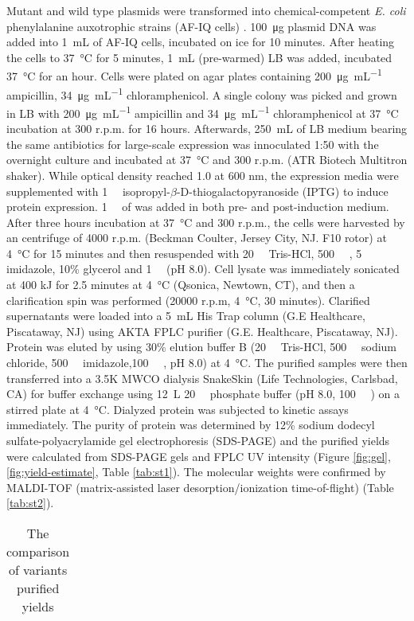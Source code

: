 \begin{refsection}
Mutant and wild type plasmids were transformed into chemical-competent \emph{E.
coli} phenylalanine auxotrophic strains (AF-IQ cells) \cite{Yang2014a}.
\SI{100}{\micro\gram} plasmid DNA was added into \SI{1}{\mL} of AF-IQ cells,
incubated on ice for 10 minutes.  After heating the cells to \SI{37}{\celsius}
for 5 minutes, \SI{1}{\mL} (pre-warmed) LB was added, incubated
\SI{37}{\celsius} for an hour. Cells were plated on agar plates containing
\SI{200}{\ug\per\mL} ampicillin, \SI{34}{\ug\per\mL} chloramphenicol. A single
colony was picked and grown in LB with \SI{200}{\ug\per\mL} ampicillin and
\SI{34}{\ug\per\mL} chloramphenicol at \SI{37}{\celsius} incubation at 300
r.p.m. for 16 hours.  Afterwards, \SI{250}{\mL} of LB medium bearing the same
antibiotics for large-scale expression was innoculated 1:50 with the overnight
culture and incubated at \SI{37}{\celsius} and 300 r.p.m. (ATR Biotech
Multitron shaker). While optical density reached 1.0 at 600 nm, the expression
media were supplemented with \SI{1}{\milli\Molar}
isopropyl-$\beta$-D-thiogalactopyranoside (IPTG) to induce protein expression.
\SI{1}{\milli\Molar} of  was added in both pre- and post-induction
medium.  After three hours incubation at \SI{37}{\celsius} and 300 r.p.m., the
cells were harvested by an centrifuge of 4000 r.p.m.  (Beckman Coulter, Jersey
City, NJ. F10 rotor) at \SI{4}{\celsius} for 15 minutes and then resuspended
with \SI{20}{\milli\Molar} Tris-HCl,
\SI{500}{\milli\Molar} , \SI{5}{\milli\Molar} imidazole, 10\% glycerol
and \SI{1}{\micro\Molar}  (pH 8.0). Cell lysate was immediately
sonicated at 400 kJ for 2.5 minutes at \SI{4}{\celsius} (Qsonica, Newtown, CT),
and then a clarification spin was performed (20000 r.p.m, \SI{4}{\celsius}, 30
minutes).  Clarified supernatants were loaded into a \SI{5}{\mL} His Trap
column (G.E Healthcare, Piscataway, NJ) using AKTA FPLC purifier (G.E.
Healthcare, Piscataway, NJ).  Protein was eluted by using 30\% elution buffer B
(\SI{20}{\milli\Molar} Tris-HCl, \SI{500}{\milli\Molar} sodium chloride,
\SI{500}{\milli\Molar} imidazole,\SI{100}{\micro\Molar} , pH 8.0) at
\SI{4}{\celsius}.  The purified samples were then transferred into a 3.5K MWCO
dialysis SnakeSkin (Life Technologies, Carlsbad, CA) for buffer exchange using
\SI{12}{\L} \SI{20}{\milli\Molar} phosphate buffer (pH 8.0,
\SI{100}{\micro\Molar} ) on a stirred plate at \SI{4}{\celsius}.
Dialyzed protein was subjected to kinetic assays immediately. The purity of
protein was determined by 12\% sodium dodecyl sulfate-polyacrylamide gel
electrophoresis (SDS-PAGE) and the purified yields were calculated from
SDS-PAGE gels and FPLC UV intensity (Figure \ref{fig:gel},
\ref{fig:yield-estimate}, Table \ref{tab:st1}). The molecular weights were
confirmed by MALDI-TOF (matrix-assisted laser desorption/ionization
time-of-flight) (Table \ref{tab:st2}).
\begin{table}
    \caption{The comparison of variants purified yields}
    \centering
    \begin{tabular}{lll}
    \hline


\end{tabular}
\end{table}
\end{refsection}
